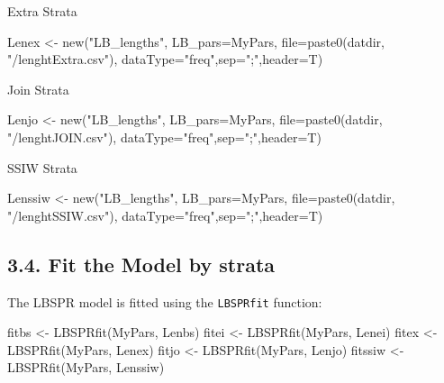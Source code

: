 \documentclass[
]{article}
\newenvironment{Shaded}{\begin{snugshade}}{\end{snugshade}}
\newcommand{\AttributeTok}[1]{\textcolor[rgb]{0.77,0.63,0.00}{#1}}
\newcommand{\FunctionTok}[1]{\textcolor[rgb]{0.00,0.00,0.00}{#1}}
\newcommand{\NormalTok}[1]{#1}
\newcommand{\OtherTok}[1]{\textcolor[rgb]{0.56,0.35,0.01}{#1}}
\newcommand{\StringTok}[1]{\textcolor[rgb]{0.31,0.60,0.02}{#1}}
\begin{document}
Extra Strata

\begin{Shaded}
\begin{Highlighting}[]
\NormalTok{Lenex }\OtherTok{\textless{}{-}} \FunctionTok{new}\NormalTok{(}\StringTok{"LB\_lengths"}\NormalTok{, }\AttributeTok{LB\_pars=}\NormalTok{MyPars, }\AttributeTok{file=}\FunctionTok{paste0}\NormalTok{(datdir, }\StringTok{"/lenghtExtra.csv"}\NormalTok{), }\AttributeTok{dataType=}\StringTok{"freq"}\NormalTok{,}\AttributeTok{sep=}\StringTok{";"}\NormalTok{,}\AttributeTok{header=}\NormalTok{T)}
\end{Highlighting}
\end{Shaded}

Join Strata

\begin{Shaded}
\begin{Highlighting}[]
\NormalTok{Lenjo }\OtherTok{\textless{}{-}} \FunctionTok{new}\NormalTok{(}\StringTok{"LB\_lengths"}\NormalTok{, }\AttributeTok{LB\_pars=}\NormalTok{MyPars, }\AttributeTok{file=}\FunctionTok{paste0}\NormalTok{(datdir, }\StringTok{"/lenghtJOIN.csv"}\NormalTok{), }\AttributeTok{dataType=}\StringTok{"freq"}\NormalTok{,}\AttributeTok{sep=}\StringTok{";"}\NormalTok{,}\AttributeTok{header=}\NormalTok{T)}
\end{Highlighting}
\end{Shaded}

SSIW Strata

\begin{Shaded}
\begin{Highlighting}[]
\NormalTok{Lenssiw }\OtherTok{\textless{}{-}} \FunctionTok{new}\NormalTok{(}\StringTok{"LB\_lengths"}\NormalTok{, }\AttributeTok{LB\_pars=}\NormalTok{MyPars, }\AttributeTok{file=}\FunctionTok{paste0}\NormalTok{(datdir, }\StringTok{"/lenghtSSIW.csv"}\NormalTok{), }\AttributeTok{dataType=}\StringTok{"freq"}\NormalTok{,}\AttributeTok{sep=}\StringTok{";"}\NormalTok{,}\AttributeTok{header=}\NormalTok{T)}
\end{Highlighting}
\end{Shaded}

\hypertarget{fit-the-model-by-strata}{%
\subsection{3.4. Fit the Model by
strata}\label{fit-the-model-by-strata}}

The LBSPR model is fitted using the \texttt{LBSPRfit} function:

\begin{Shaded}
\begin{Highlighting}[]
\NormalTok{fitbs }\OtherTok{\textless{}{-}} \FunctionTok{LBSPRfit}\NormalTok{(MyPars, Lenbs)}
\NormalTok{fitei }\OtherTok{\textless{}{-}} \FunctionTok{LBSPRfit}\NormalTok{(MyPars, Lenei)}
\NormalTok{fitex }\OtherTok{\textless{}{-}} \FunctionTok{LBSPRfit}\NormalTok{(MyPars, Lenex)}
\NormalTok{fitjo }\OtherTok{\textless{}{-}} \FunctionTok{LBSPRfit}\NormalTok{(MyPars, Lenjo)}
\NormalTok{fitssiw }\OtherTok{\textless{}{-}} \FunctionTok{LBSPRfit}\NormalTok{(MyPars, Lenssiw)}
\end{Highlighting}
\end{Shaded}
\end{document}
